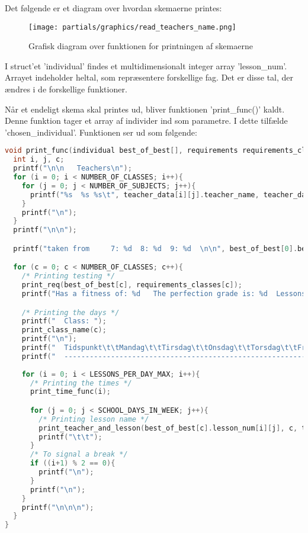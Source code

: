 Det følgende er et diagram over hvordan skemaerne printes:
\begin{figure}[!h]
\texttt{[image: partials/graphics/read\_teachers\_name.png]}
\caption{Grafisk diagram over funktionen for printningen af skemaerne}
\label{fig:diagramprint}
\end{figure}

I struct’et ’individual’ findes et multidimensionalt integer array ’lesson\_num’. Arrayet indeholder heltal, som repræsentere forskellige fag. Det er disse tal, der ændres i de forskellige funktioner. 

Når et endeligt skema skal printes ud, bliver funktionen ’print\_func()’ kaldt. Denne funktion tager et array af individer ind som parametre. I dette tilfælde ’chosen\_individual’. Funktionen ser ud som følgende:
\begin{lstlisting}[language = C]
void print_func(individual best_of_best[], requirements requirements_classes[], int generation_print, teacher teacher_data[][NUMBER_OF_SUBJECTS]){
  int i, j, c;
  printf("\n\n   Teachers\n");
  for (i = 0; i < NUMBER_OF_CLASSES; i++){
    for (j = 0; j < NUMBER_OF_SUBJECTS; j++){
      printf("%s  %s %s\t", teacher_data[i][j].teacher_name, teacher_data[i][j].lesson_name, teacher_data[i][j].class_name);
    }
    printf("\n");
  }
  printf("\n\n");

  printf("taken from     7: %d  8: %d  9: %d  \n\n", best_of_best[0].best_gena7, best_of_best[0].best_gena8, best_of_best[0].best_gena9);

  for (c = 0; c < NUMBER_OF_CLASSES; c++){
    /* Printing testing */
    print_req(best_of_best[c], requirements_classes[c]);
    printf("Has a fitness of: %d   The perfection grade is: %d  Lessons with parallel: %d  Lessons With Both: %d  Heavy lessons after: %d Before: %d   Overbooked: %d \n\n", best_of_best[c].fitness, best_of_best[c].perfection, best_of_best[c].lessons_with_parallel, best_of_best[c].lessons_with_both, best_of_best[c].heavy_lesson_after, best_of_best[c].heavy_lesson_before, best_of_best[c].teacher_overbooked);

    /* Printing the days */
    printf("  Class: ");
    print_class_name(c);
    printf("\n");
    printf("  Tidspunkt\t\tMandag\t\tTirsdag\t\tOnsdag\t\tTorsdag\t\tFredag\n");
    printf("  ------------------------------------------------------------------------------------------------\n");
    
    for (i = 0; i < LESSONS_PER_DAY_MAX; i++){
      /* Printing the times */
      print_time_func(i);

      for (j = 0; j < SCHOOL_DAYS_IN_WEEK; j++){
        /* Printing lesson name */
        print_teacher_and_lesson(best_of_best[c].lesson_num[i][j], c, teacher_data);
        printf("\t\t");
      }
      /* To signal a break */
      if ((i+1) % 2 == 0){
        printf("\n");
      }
      printf("\n");
    }
    printf("\n\n\n");
  }
}
\end{lstlisting}

